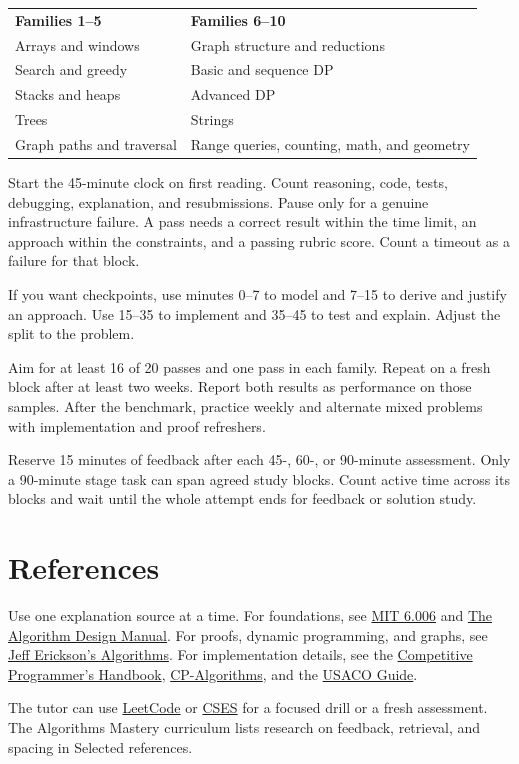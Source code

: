 \documentclass[11pt,letterpaper]{article}
\begin{document}
\begin{center}
\small
\begin{tabular}{>{\raggedright\arraybackslash}p{}>{\raggedright\arraybackslash}p{}}
\textbf{Families 1--5} & \textbf{Families 6--10} \\
Arrays and windows & Graph structure and reductions \\
Search and greedy & Basic and sequence DP \\
Stacks and heaps & Advanced DP \\
Trees & Strings \\
Graph paths and traversal & Range queries, counting, math, and geometry \\
\end{tabular}
\end{center}

Start the 45-minute clock on first reading. Count reasoning, code, tests, debugging, explanation, and resubmissions. Pause only for a genuine infrastructure failure. A pass needs a correct result within the time limit, an approach within the constraints, and a passing rubric score. Count a timeout as a failure for that block.

If you want checkpoints, use minutes 0--7 to model and 7--15 to derive and justify an approach. Use 15--35 to implement and 35--45 to test and explain. Adjust the split to the problem.

Aim for at least 16 of 20 passes and one pass in each family. Repeat on a fresh block after at least two weeks. Report both results as performance on those samples. After the benchmark, practice weekly and alternate mixed problems with implementation and proof refreshers.

Reserve 15 minutes of feedback after each 45-, 60-, or 90-minute assessment. Only a 90-minute stage task can span agreed study blocks. Count active time across its blocks and wait until the whole attempt ends for feedback or solution study.

\section{References}

Use one explanation source at a time. For foundations, see \href{https://ocw.mit.edu/courses/6-006-introduction-to-algorithms-spring-2020/}{MIT 6.006} and \href{https://algorist.com/}{The Algorithm Design Manual}. For proofs, dynamic programming, and graphs, see \href{https://jeffe.cs.illinois.edu/teaching/algorithms/}{Jeff Erickson's Algorithms}. For implementation details, see the \href{https://cses.fi/book/book.pdf}{Competitive Programmer's Handbook}, \href{https://cp-algorithms.com/}{CP-Algorithms}, and the \href{https://usaco.guide/}{USACO Guide}.

The tutor can use \href{https://leetcode.com/problemset/}{LeetCode} or \href{https://cses.fi/problemset/}{CSES} for a focused drill or a fresh assessment. The Algorithms Mastery curriculum lists research on feedback, retrieval, and spacing in Selected references.
\end{document}
